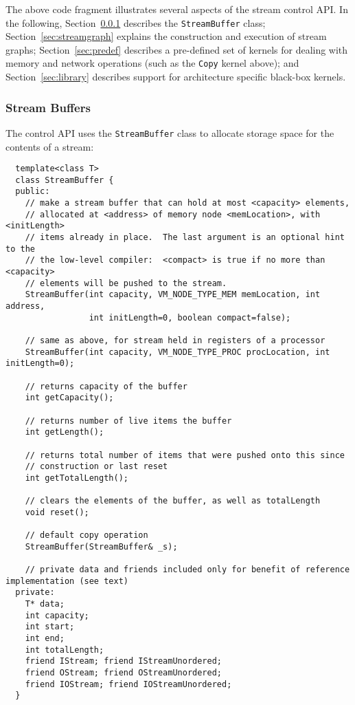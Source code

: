 The above code fragment illustrates several aspects of the stream
control API.  In the following, Section~\ref{sec:procstreams}
describes the {\tt StreamBuffer} class; Section~\ref{sec:streamgraph}
explains the construction and execution of stream graphs;
Section~\ref{sec:predef} describes a pre-defined set of kernels for
dealing with memory and network operations (such as the {\tt Copy}
kernel above); and Section~\ref{sec:library} describes support for
architecture specific black-box kernels.

\subsubsection{Stream Buffers}
\label{sec:procstreams}

The control API uses the {\tt StreamBuffer} class to allocate storage
space for the contents of a stream:
{\small
\begin{verbatim}
  template<class T>
  class StreamBuffer {
  public:
    // make a stream buffer that can hold at most <capacity> elements,
    // allocated at <address> of memory node <memLocation>, with <initLength>
    // items already in place.  The last argument is an optional hint to the
    // the low-level compiler:  <compact> is true if no more than <capacity>
    // elements will be pushed to the stream.
    StreamBuffer(int capacity, VM_NODE_TYPE_MEM memLocation, int address, 
                 int initLength=0, boolean compact=false);

    // same as above, for stream held in registers of a processor
    StreamBuffer(int capacity, VM_NODE_TYPE_PROC procLocation, int initLength=0);

    // returns capacity of the buffer
    int getCapacity();

    // returns number of live items the buffer
    int getLength();

    // returns total number of items that were pushed onto this since
    // construction or last reset
    int getTotalLength();

    // clears the elements of the buffer, as well as totalLength
    void reset();

    // default copy operation
    StreamBuffer(StreamBuffer& _s);

    // private data and friends included only for benefit of reference implementation (see text)
  private:
    T* data;
    int capacity;
    int start;
    int end;
    int totalLength;
    friend IStream; friend IStreamUnordered;
    friend OStream; friend OStreamUnordered;
    friend IOStream; friend IOStreamUnordered;
  }
\end{verbatim}}

